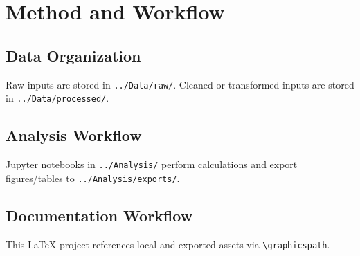 \section{Method and Workflow}

\subsection{Data Organization}
Raw inputs are stored in \texttt{../Data/raw/}. Cleaned or transformed inputs are stored in \texttt{../Data/processed/}.

\subsection{Analysis Workflow}
Jupyter notebooks in \texttt{../Analysis/} perform calculations and export figures/tables to \texttt{../Analysis/exports/}.

\subsection{Documentation Workflow}
This LaTeX project references local and exported assets via \texttt{\textbackslash graphicspath}.
